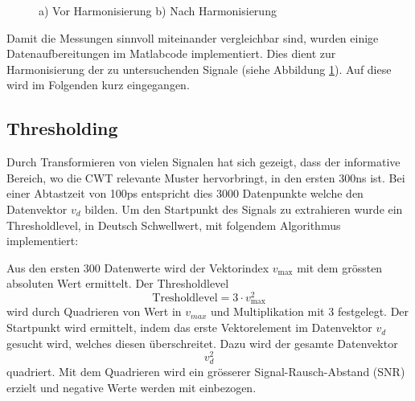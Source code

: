 \begin{refsection}
\begin{figure}
	\begin{subfigure}
		\centering
	\end{subfigure}
	\begin{subfigure}
		\centering
	\end{subfigure}	
\caption{a) Vor Harmonisierung b) Nach Harmonisierung}
\label{fig:Zeitsig}
\end{figure}

Damit die Messungen sinnvoll miteinander vergleichbar sind, wurden einige Datenaufbereitungen im Matlabcode implementiert.
Dies dient zur Harmonisierung der zu untersuchenden Signale (siehe Abbildung \ref{fig:Zeitsig}). 
Auf diese wird im Folgenden kurz eingegangen.

\subsection{Thresholding}
Durch Transformieren von vielen Signalen hat sich gezeigt, dass der informative Bereich, wo die CWT relevante Muster hervorbringt, in den ersten 300ns ist.
Bei einer Abtastzeit von 100ps entspricht dies 3000 Datenpunkte welche den Datenvektor $v_d$ bilden.
Um den Startpunkt des Signals zu extrahieren wurde ein Thresholdlevel, in Deutsch Schwellwert, mit folgendem Algorithmus implementiert:

Aus den ersten 300 Datenwerte wird der Vektorindex $v_\text{max}$ mit dem grössten absoluten Wert ermittelt.
Der Thresholdlevel
\begin{equation}
\text{Tresholdlevel} = 3\cdot v_\text{max}^2
\end{equation}
wird durch Quadrieren von Wert in $v_{max}$ und Multiplikation mit 3 festgelegt.
Der Startpunkt wird ermittelt, indem das erste Vektorelement im Datenvektor $v_d$ gesucht wird, welches diesen überschreitet.
Dazu wird der gesamte Datenvektor 
\begin{equation}
\text{$v_d^2$}
\end{equation}
quadriert.
Mit dem Quadrieren wird ein grösserer Signal-Rausch-Abstand (SNR) erzielt und negative Werte werden mit einbezogen.


\end{refsection}
